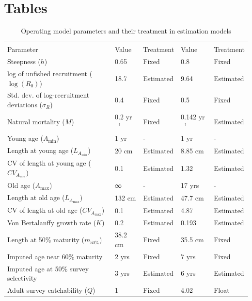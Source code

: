 \documentclass[
  letterpaper,
  DIV=11,
  numbers=noendperiod]{scrartcl}
\author{}
\date{}
\begin{document}
\section{Tables}\label{tables}

\vspace{0.1mm}

\begin{table}[H]
\centering
\caption{\label{tab:om-table}Operating model parameters and their treatment in estimation models}
\centering
\fontsize{10}{12}\selectfont
\begin{tabu} to 
\toprule
{} &  &  \\
\cmidrule(l{3pt}r{3pt}){2-3} \cmidrule(l{3pt}r{3pt}){4-5}
Parameter & Value & Treatment & Value & Treatment\\
\midrule
Steepness ($h$) & 0.65 & Fixed & 0.8 & Fixed\\
log of unfished recruitment ($\log(R_0)$) & 18.7 & Estimated & 9.64 & Estimated\\
Std. dev. of log-recruitment deviations ($\sigma_R$) & 0.4 & Fixed & 0.5 & Fixed\\
Natural mortality ($M$) & 0.2 yr$^{-1}$ & Fixed & 0.142 yr$^{-1}$ & Estimated\\
Young age ($A_{\min}$) & 1 yr & - & 1 yr & -\\
\addlinespace
Length at young age ($L_{A_{\min}}$) & 20 cm & Estimated & 8.85 cm & Estimated\\
CV of length at young age ($CV_{A_{\min}}$) & 0.1 & Estimated & 1.32 & Estimated\\
Old age ($A_{\max}$) & ∞ & - & 17 yrs & -\\
Length at old age ($L_{A_{\max}}$) & 132 cm & Estimated & 47.7 cm & Estimated\\
CV of length at old age ($CV_{A_{\max}}$) & 0.1 & Estimated & 4.87 & Estimated\\
\addlinespace
Von Bertalanffy growth rate ($K$) & 0.2 & Estimated & 0.193 & Estimated\\
Length at 50\% maturity ($m_{50\%}$) & 38.2 cm & Fixed & 35.5 cm & Fixed\\
Imputed age near 60\% maturity & 2 yrs & Fixed & 7 yrs & Fixed\\
Imputed age at 50\% survey selectivity & 3 yrs & Estimated & 6 yrs & Estimated\\
Adult survey catchability ($Q$) & 1 & Fixed & 4.02 & Float\\
\bottomrule
\end{tabu}
\end{table}
\end{document}
